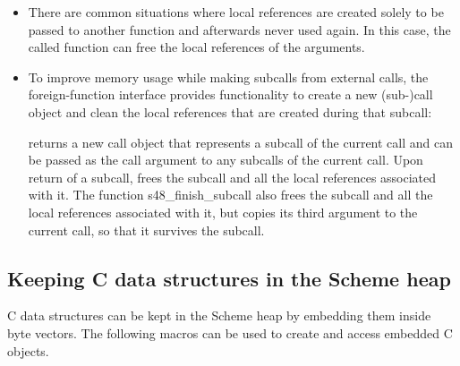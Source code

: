 \begin{itemize}
\item There are common situations where local references are created
  solely to be passed to another function and afterwards never used
  again.  In this case, the called function can free the local
  references of the arguments.

\item To improve memory usage while making subcalls from external
  calls, the foreign-function interface provides functionality to
  create a new (sub-)call object and clean the local references that
  are created during that subcall:

  \begin{protos}
  \end{protos}

   returns a new call object that represents a
  subcall of the current call and can be passed as the call argument
  to any subcalls of the current call.  Upon return of a subcall,
   frees the subcall and all the local
  references associated with it.  The function {s48\_finish\_subcall}
  also frees the subcall and all the local references associated with
  it, but copies its third argument to the current call, so that it
  survives the subcall.

\end{itemize}

\subsection{Keeping C data structures in the Scheme heap}
\label{sec:external-data}

C data structures can be kept in the Scheme heap by embedding them
 inside byte vectors.
The following macros can be used to create and access embedded C objects.

\begin{protos}
\end{protos}

